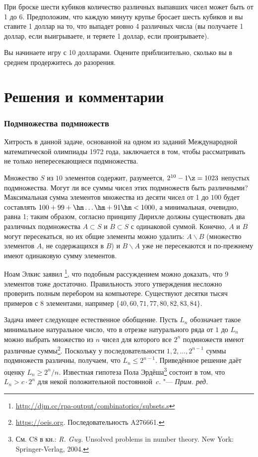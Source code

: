 \documentclass[twoside]{book}
\newenvironment{addedbytheeditors}{\par\medskip\small
}{\par\addvspace{\medskipamount}} %
\begin{document}
При броске шести кубиков количество различных выпавших чисел может быть от 1 до 6.
Предположим, что каждую минуту крупье бросает шесть кубиков
и вы ставите 1 доллар на то, что выпадет ровно 4 различных числа
(вы получаете 1 доллар, если выигрываете, и теряете 1 доллар, если проигрываете).

Вы начинаете игру с 10 долларами.
Оцените приблизительно, сколько вы в среднем продержитесь до разорения.


\section*{Решения и комментарии}

\subsubsection*{Подмножества подмножеств}%

Хитрость в данной задаче, основанной на одном из заданий Международной
математической олимпиады 1972 года, заключается в том, чтобы рассматривать не только непересекающиеся
подмножества.

\medskip

Множество $S$ из $10$ элементов содержит, разумеется, $2^{10} - 1 \z=
1023$ непустых подмножества.
Могут ли все суммы чисел этих
подмножеств быть различными?  Максимальная сумма элементов множества
из десяти чисел от 1 до $100$ будет составлять
$100+99+\hm\ldots\hm+91\hm<1000$, а минимальная, очевидно, равна 1;
таким образом, согласно принципу Дирихле должны существовать два
различных подмножества $A\subset S$ и $B\subset S$ с одинаковой
суммой.
Конечно, $A$ и $B$ могут пересекаться, но их общие элементы
можно удалить: $A\backslash B$ (множество элементов $A$, не
содержащихся в $B$) и $B\backslash A$ уже не пересекаются и
по-прежнему имеют одинаковую сумму элементов.\heart

\begin{addedbytheeditors}
Ноам Элкис заявил%
\footnote{\url{http://djm.cc/rpa-output/combinatorics/subsets.s}}, что подобным рассуждением можно доказать, что 9 элементов тоже достаточно.
Правильность этого утверждения несложно проверить полным перебором на компьютере.
Существуют десятки тысяч примеров с 8 элементами, например $\{40,60,71,77,80,82,83,84\}$. 

Задача имеет следующее естественное обобщение.
Пусть $L_n$ обозначает такое минимальное натуральное число,
что в отрезке натурального ряда от $1$ до $L_n$ можно выбрать множество из $n$ чисел для которого все $2^n$ подмножеств имеют различные суммы\footnote{%
\url{https://oeis.org}. Последовательность A276661.}.
Поскольку у последовательности $1,2,\dots, 2^{n-1}$ суммы подмножеств различны, получаем, что $L_n\le 2^{n-1}$.
Приведённое решение даёт оценку $L_n\ge 2^n/n$.
Известная гипотеза Пола Эрдёша\footnote{См. C8 в кн.: \emph{R. Guy.} Unsolved problems in number theory. New York: Springer-Verlag, 2004.} состоит в том, что $L_n>c\cdot 2^n$ для некой положительной постоянной~$c$.
"--- \emph{Прим. ред.}  
\end{addedbytheeditors}
\end{document}
